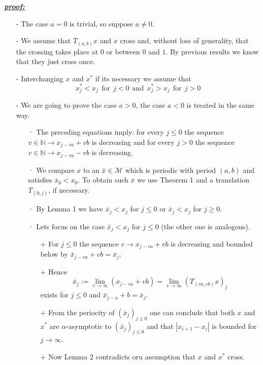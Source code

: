 \documentclass{article}
\begin{document}
\color{blue}
	\noindent \underline{\textbf{\textit{proof:}}} 		
		\begin{itemize}
			\item[-] The case $a = 0$ is trivial, so suppose $a \neq 0$.
			\item[-] We assume that $T_{(a, b)}x$ and $x$ cross and, without loss of generality, that the crossing takes place at $0$ or between $0$ and $1$. By previous results we know that they just cross once.
			\item[-] Interchanging $x$ and $x^{*}$ if its necessary we assume that
				$$
					x_{j}^{*} < x_j \ \ \text{for} \ \ j < 0 \ \ \text{and} \ \ x_{j}^{*} > x_j \ \ \text{for} \ \ j > 0
				$$ 
			\item[-] We are going to prove the case $a > 0$, the case $a < 0$ is treated in the same way.
			\begin{itemize}
				\item[·] The preceding equations imply: for every $j \leq 0$ the sequence $v \in \mathbb{N} \rightarrow x_{j - va} + vb$ is decreasing and for every $j > 0$ the sequence $v \in \mathbb{N} \rightarrow x_{j - va} - vb$ is decreasing.
				\item[·] We compare $x$ to an $\bar{x} \in \mathcal{M}$ which is periodic with period $(a, b)$ and satisfies $\bar{x}_{0} < x_{0}$. To obtain such $\bar{x}$ we use Theorem 1 and a translation $T_{(0, j)}$, if necessary.
				\item[·] By Lemma 1 we have $\bar{x}_{j} < x_{j}$ for $j \leq 0$ or $\bar{x}_{j} < x_{j}$ for $j \geq 0$.
				\item[·] Lets focus on the case $\bar{x}_{j} < x_{j}$ for $j \leq 0$ (the other one is analogous).
				\begin{itemize}
					\item[+] For $j \leq 0$ the sequence $v \rightarrow x_{j - va} + vb$ is decreasing and bounded below by $\bar{x}_{j - va} + vb = \bar{x}_{j}$. 
					\item[+] Hence
						$$
							\bar{x}_{j} := \lim_{ v \rightarrow \infty} (x_{j - va} + vb) = \lim_{v \rightarrow \infty} (T_{(va, vb)} x)_{j}
						$$
					exists for $j \leq 0$ and $\bar{x}_{j - a} + b = \bar{x}_j$.
					\item[+] From the periocity of $(\bar{x}_j)_{j \leq 0}$ one can conclude that both $x$ and $x^{*}$ are $\alpha$-asymptotic to $(\bar{x}_j)_{j \leq 0}$ and that $| x_{i + 1} - x_{i} |$ is bounded for $j \rightarrow \infty$.
					\item[+] Now Lemma 2 contradicts oru assumption that $x$ and $x^{*}$ cross.
				\end{itemize}
			\end{itemize}
		\end{itemize}
	
\end{document}
